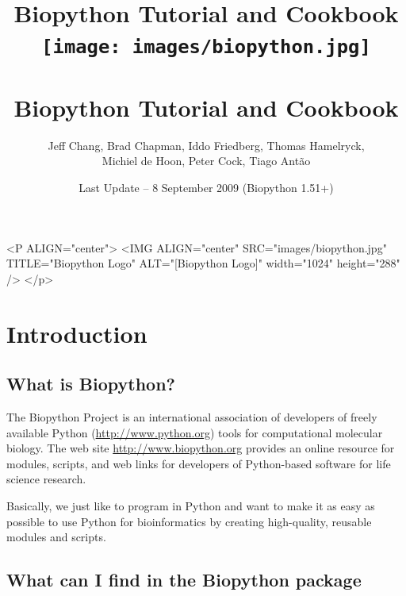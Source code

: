 \documentclass{report}
\begin{document}
\begin{htmlonly}
\title{Biopython Tutorial and Cookbook}
\end{htmlonly}
\begin{latexonly}
\title{
\texttt{[image: images/biopython.jpg]}\\
~\\
Biopython Tutorial and Cookbook}
\end{latexonly}

\author{Jeff Chang, Brad Chapman, Iddo Friedberg, Thomas Hamelryck, \\
Michiel de Hoon, Peter Cock, Tiago Ant\~ao}
\date{Last Update -- 8 September 2009 (Biopython 1.51+)}

\begin{rawhtml}
<P ALIGN="center">
<IMG ALIGN="center" SRC="images/biopython.jpg" TITLE="Biopython Logo" ALT="[Biopython Logo]" width="1024" height="288" />
</p>
\end{rawhtml}

\maketitle
\tableofcontents

\chapter{Introduction}
\label{chapter:introduction}

\section{What is Biopython?}

The Biopython Project is an international association of developers of freely available Python (\url{http://www.python.org}) tools for computational molecular biology. The web site \url{http://www.biopython.org} provides an online resource for modules, scripts, and web links for developers of Python-based software for life science research.

Basically, we just like to program in Python and want to make it as easy as possible to use Python for bioinformatics by creating high-quality, reusable modules and scripts.

\section{What can I find in the Biopython package}
\end{document}
